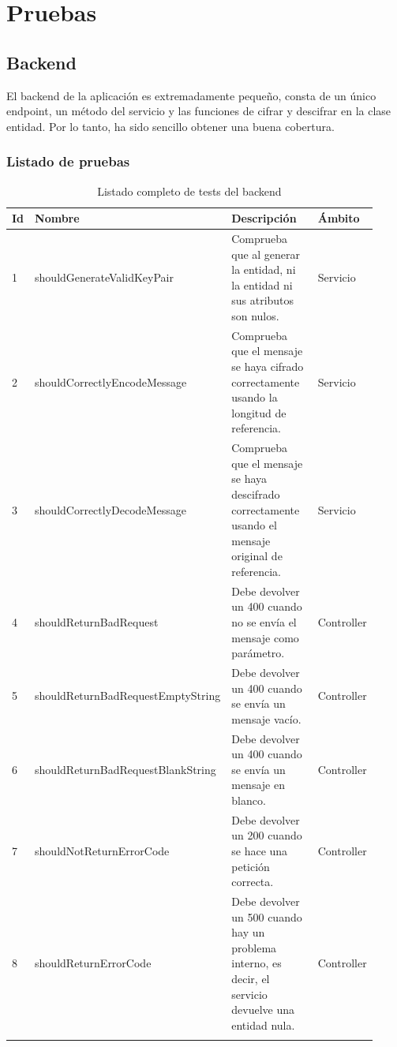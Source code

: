 \chapter{Pruebas}\label{pruebas}

\section{Backend}

El backend de la aplicación es extremadamente pequeño, consta de un único endpoint, un método del servicio y las funciones de cifrar y descifrar en la clase entidad. Por lo tanto, ha sido sencillo obtener una buena cobertura.

\subsection{Listado de pruebas}

\begin{longtable}{|p{0.02\linewidth}|p{0.39\linewidth}|p{0.4\linewidth}|p{0.11\linewidth}|}

    \hline \textbf{Id} & \textbf{Nombre} & \textbf{Descripción} & \textbf{Ámbito} \\ \hline \endhead
    
    1 & shouldGenerateValidKeyPair & Comprueba que al generar la entidad, ni la entidad ni sus atributos son nulos. & Servicio \\ \hline
    2 & shouldCorrectlyEncodeMessage & Comprueba que el mensaje se haya cifrado correctamente usando la longitud de referencia. & Servicio \\ \hline
    3 & shouldCorrectlyDecodeMessage & Comprueba que el mensaje se haya descifrado correctamente usando el mensaje original de referencia. & Servicio \\ \hline
    
    4 & shouldReturnBadRequest & Debe devolver un 400 cuando no se envía el mensaje como parámetro. & Controller \\ \hline
    5 & shouldReturnBadRequestEmptyString & Debe devolver un 400 cuando se envía un mensaje vacío. & Controller \\ \hline
    6 & shouldReturnBadRequestBlankString & Debe devolver un 400 cuando se envía un mensaje en blanco. & Controller \\ \hline
    7 & shouldNotReturnErrorCode & Debe devolver un 200 cuando se hace una petición correcta. & Controller \\ \hline
    8 & shouldReturnErrorCode & Debe devolver un 500 cuando hay un problema interno, es decir, el servicio devuelve una entidad nula. & Controller \\ \hline
    
    \caption{Listado completo de tests del backend}
    \label{tab:tests-backend}
\end{longtable}

